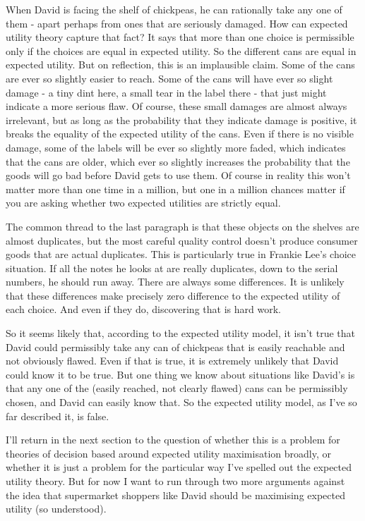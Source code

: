 \documentclass[
  12pt,
]{article}
\begin{document}
When David is facing the shelf of chickpeas, he can rationally take any one of them - apart perhaps from ones that are seriously damaged. How can expected utility theory capture that fact? It says that more than one choice is permissible only if the choices are equal in expected utility. So the different cans are equal in expected utility. But on reflection, this is an implausible claim. Some of the cans are ever so slightly easier to reach. Some of the cans will have ever so slight damage - a tiny dint here, a small tear in the label there - that just might indicate a more serious flaw. Of course, these small damages are almost always irrelevant, but as long as the probability that they indicate damage is positive, it breaks the equality of the expected utility of the cans. Even if there is no visible damage, some of the labels will be ever so slightly more faded, which indicates that the cans are older, which ever so slightly increases the probability that the goods will go bad before David gets to use them. Of course in reality this won't matter more than one time in a million, but one in a million chances matter if you are asking whether two expected utilities are strictly equal.

The common thread to the last paragraph is that these objects on the shelves are almost duplicates, but the most careful quality control doesn't produce consumer goods that are actual duplicates. This is particularly true in Frankie Lee's choice situation. If all the notes he looks at are really duplicates, down to the serial numbers, he should run away. There are always some differences. It is unlikely that these differences make precisely zero difference to the expected utility of each choice. And even if they do, discovering that is hard work.

So it seems likely that, according to the expected utility model, it isn't true that David could permissibly take any can of chickpeas that is easily reachable and not obviously flawed. Even if that is true, it is extremely unlikely that David could know it to be true. But one thing we know about situations like David's is that any one of the (easily reached, not clearly flawed) cans can be permissibly chosen, and David can easily know that. So the expected utility model, as I've so far described it, is false.

I'll return in the next section to the question of whether this is a problem for theories of decision based around expected utility maximisation broadly, or whether it is just a problem for the particular way I've spelled out the expected utility theory. But for now I want to run through two more arguments against the idea that supermarket shoppers like David should be maximising expected utility (so understood).
\end{document}
